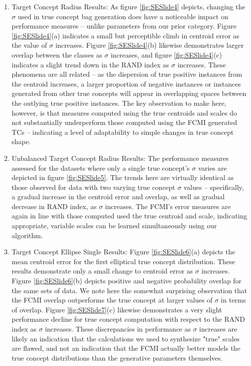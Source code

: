 \documentclass[12pt,dvips]{report}
\numberwithin{equation}{section}
\begin{document}
\begin{enumerate}
\begin{enumerate}
	\item Target Concept Radius Results: As figure \ref{fig:SESlide4} depicts, changing the $\sigma$ used in true concept bag generation does have a noticeable impact on performance measures -- unlike parameters from our prior category.  Figure \ref{fig:SESlide4}(a) indicates a small but perceptible climb in centroid error as the value of $\sigma$ increases.  Figure \ref{fig:SESlide4}(b) likewise demonstrates larger overlap between the classes as $\sigma$ increases, and figure \ref{fig:SESlide4}(c) indicates a slight trend down in the RAND index as $\sigma$ increases.    These phenomena are all related -- as the dispersion of true positive instances from the centroid increases, a larger proportion of negative instances or instances generated from other true concepts will appear in overlapping spaces between the outlying true positive instances.  The key observation to make here, however, is that measures computed using the true centroids and scales do not substantially underperform those computed using the FCMI generated TCs -- indicating a level of adaptability to simple changes in true concept shape.

	\item Unbalanced Target Concept Radius Results: The performance measures assessed for the datasets where only a single true concept's $\sigma$ varies are depicted in figure \ref{fig:SESlide5}. The trends here are virtually identical as those observed for data with two varying true concept $\sigma$ values -- specifically, a gradual increase in the centroid error and overlap, as well as gradual decrease in RAND index, as $\sigma$ increases.  The FCMI's error measures are again in line with those computed used the true centroid and scale, indicating appropriate, variable scales can be learned simultaneously using our algorithm.

	\item Target Concept Ellipse Single Results: Figure \ref{fig:SESlide6}(a) depicts the mean centroid error for the first elliptical true concept distribution.  These results demonstrate only a small change to centroid error as $\sigma$ increases.  Figure \ref{fig:SESlide6}(b) depicts positive and negative probability overlap for the same sets of data.  We note here the somewhat surprising observation that the FCMI overlap outperforms the true concept at larger values of $\sigma$ in terms of overlap.  Figure \ref{fig:SESlide7}(c) likewise demonstrates a very slight performance decline for true concept computation with respect to the RAND index as $\sigma$ increases.  These discrepancies in performance as $\sigma$ increases are likely an indication that the calculations we used to synthesize "true" scales are flawed, and not an indication that the FCMI actually better models the true concept distributions than the generative parameters themselves.


\end{enumerate}
\end{enumerate}
\end{document}
